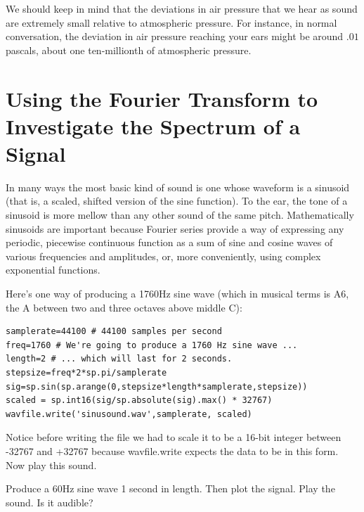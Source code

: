 We should keep in mind that the deviations in air pressure that we hear as sound are extremely small relative to atmospheric pressure. For instance, in normal conversation, the deviation in air pressure reaching your ears might be around $.01$ pascals, about one ten-millionth of atmospheric pressure.


\section*{Using the Fourier Transform to Investigate the Spectrum of a Signal}

In many ways the most basic kind of sound is one whose waveform is a sinusoid (that is, a scaled, shifted version of the sine function). 
To the ear, the tone of a sinusoid is more mellow than any other sound of the same pitch. 
Mathematically sinusoids are important because Fourier series provide a way of expressing any periodic, piecewise continuous function as a sum of sine and cosine waves of various frequencies and amplitudes, or, more conveniently, using complex exponential functions.

Here's one way of producing a 1760Hz sine wave (which in musical terms is A6, the A between two and three octaves above middle C):
% 
\begin{lstlisting}
samplerate=44100 # 44100 samples per second
freq=1760 # We're going to produce a 1760 Hz sine wave ...
length=2 # ... which will last for 2 seconds.
stepsize=freq*2*sp.pi/samplerate
sig=sp.sin(sp.arange(0,stepsize*length*samplerate,stepsize))
scaled = sp.int16(sig/sp.absolute(sig).max() * 32767)
wavfile.write('sinusound.wav',samplerate, scaled)
\end{lstlisting}

Notice before writing the file we had to scale it to be a 16-bit integer between -32767 and +32767 because wavfile.write expects the data to be in this form.  Now play this sound.

\begin{problem}
Produce a 60Hz sine wave 1 second in length. Then plot the signal. Play the sound. Is it audible?
\end{problem}


